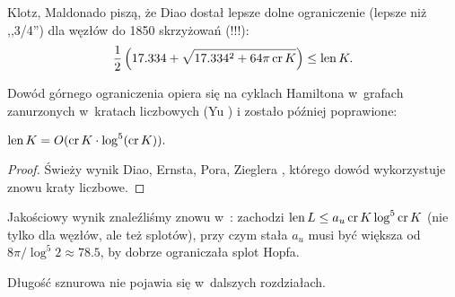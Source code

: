 Klotz, Maldonado \cite{klotz21} piszą, że Diao dostał lepsze dolne ograniczenie (lepsze niż ,,3/4'') dla węzłów do 1850 skrzyżowań (!!!):
\begin{equation}
    \frac 12 \left(17.334 + \sqrt{17.334^2 + 64 \pi \operatorname{cr} K}\right) \le \operatorname{len} K.
\end{equation}

Dowód górnego ograniczenia opiera się na cyklach Hamiltona w~grafach zanurzonych w~kratach liczbowych (Yu \cite{yu04}) i zostało później poprawione:


\begin{proposition}
    $\operatorname{len} K = O(\operatorname{cr} K \cdot \log^5(\operatorname{cr} K)).$
\end{proposition}

\begin{proof}
    Świeży wynik Diao, Ernsta, Pora, Zieglera \cite{diao19}, którego dowód wykorzystuje znowu kraty liczbowe.
\end{proof}

Jakościowy wynik znaleźliśmy znowu w~\cite{klotz21}: zachodzi $\operatorname{len} L \le a_u \operatorname{cr} K \log^5 \operatorname{cr} K$ (nie tylko dla węzłów, ale też splotów), przy czym stała $a_u$ musi być większa od $8\pi/\log^5 2 \approx 78.5$, by dobrze ograniczała splot Hopfa.

Długość sznurowa nie pojawia się w~dalszych rozdziałach.

%


